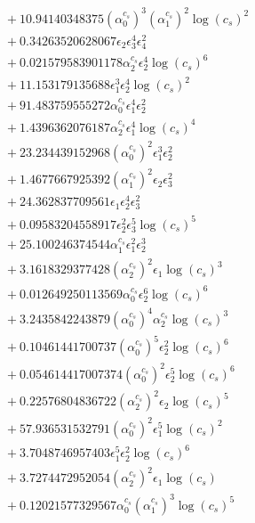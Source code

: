 \documentclass[10pt]{article}
\begin{document}
\begin{align*}
&{}  + 10.94140348375 \left(\alpha_{0}^{c_s}\right)^{3} \left(\alpha_{1}^{c_s}\right)^{2} \log{\left(c_{s} \right)}^{2} \\
&{}  + 0.34263520628067 \epsilon_{2} \epsilon_{3}^{4} \epsilon_{4}^{2} \\
&{}  + 0.021579583901178 \alpha_{2}^{c_s} \epsilon_{2}^{4} \log{\left(c_{s} \right)}^{6} \\
&{}  + 11.153179135688 \epsilon_{1}^{3} \epsilon_{2}^{4} \log{\left(c_{s} \right)}^{2} \\
&{}  + 91.483759555272 \alpha_{0}^{c_s} \epsilon_{1}^{4} \epsilon_{2}^{2} \\
&{}  + 1.4396362076187 \alpha_{2}^{c_s} \epsilon_{1}^{4} \log{\left(c_{s} \right)}^{4} \\
&{}  + 23.234439152968 \left(\alpha_{0}^{c_s}\right)^{2} \epsilon_{1}^{3} \epsilon_{2}^{2} \\
&{}  + 1.4677667925392 \left(\alpha_{1}^{c_s}\right)^{2} \epsilon_{2} \epsilon_{3}^{2} \\
&{}  + 24.362837709561 \epsilon_{1} \epsilon_{2}^{4} \epsilon_{3}^{2} \\
&{}  + 0.09583204558917 \epsilon_{2}^{2} \epsilon_{3}^{5} \log{\left(c_{s} \right)}^{5} \\
&{}  + 25.100246374544 \alpha_{1}^{c_s} \epsilon_{1}^{2} \epsilon_{2}^{3} \\
&{}  + 3.1618329377428 \left(\alpha_{2}^{c_s}\right)^{2} \epsilon_{1} \log{\left(c_{s} \right)}^{3} \\
&{}  + 0.012649250113569 \alpha_{0}^{c_s} \epsilon_{2}^{6} \log{\left(c_{s} \right)}^{6} \\
&{}  + 3.2435842243879 \left(\alpha_{0}^{c_s}\right)^{4} \alpha_{2}^{c_s} \log{\left(c_{s} \right)}^{3} \\
&{}  + 0.10461441700737 \left(\alpha_{0}^{c_s}\right)^{5} \epsilon_{2}^{2} \log{\left(c_{s} \right)}^{6} \\
&{}  + 0.054614417007374 \left(\alpha_{0}^{c_s}\right)^{2} \epsilon_{2}^{5} \log{\left(c_{s} \right)}^{6} \\
&{}  + 0.22576804836722 \left(\alpha_{2}^{c_s}\right)^{2} \epsilon_{2} \log{\left(c_{s} \right)}^{5} \\
&{}  + 57.936531532791 \left(\alpha_{0}^{c_s}\right)^{2} \epsilon_{1}^{5} \log{\left(c_{s} \right)}^{2} \\
&{}  + 3.7048746957403 \epsilon_{1}^{5} \epsilon_{2}^{2} \log{\left(c_{s} \right)}^{6} \\
&{}  + 3.7274472952054 \left(\alpha_{2}^{c_s}\right)^{2} \epsilon_{1} \log{\left(c_{s} \right)} \\
&{}  + 0.12021577329567 \alpha_{0}^{c_s} \left(\alpha_{1}^{c_s}\right)^{3} \log{\left(c_{s} \right)}^{5}
\end{align*}
\end{document}
